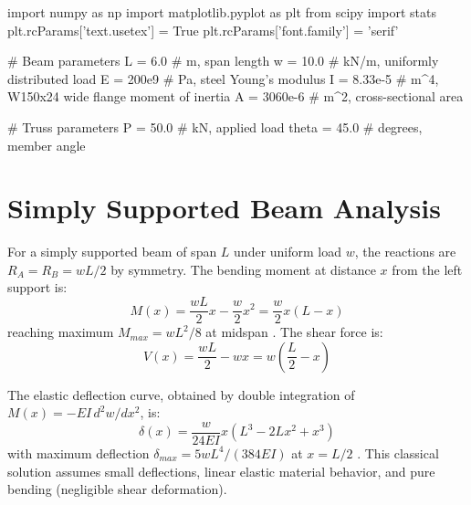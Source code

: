 \documentclass[11pt,a4paper]{article}
\begin{document}
\begin{pycode}

import numpy as np
import matplotlib.pyplot as plt
from scipy import stats
plt.rcParams['text.usetex'] = True
plt.rcParams['font.family'] = 'serif'

# Beam parameters
L = 6.0  # m, span length
w = 10.0  # kN/m, uniformly distributed load
E = 200e9  # Pa, steel Young's modulus
I = 8.33e-5  # m^4, W150x24 wide flange moment of inertia
A = 3060e-6  # m^2, cross-sectional area

# Truss parameters
P = 50.0  # kN, applied load
theta = 45.0  # degrees, member angle

\end{pycode}

\section{Simply Supported Beam Analysis}

For a simply supported beam of span $L$ under uniform load $w$, the reactions are $R_A = R_B = wL/2$ by symmetry. The bending moment at distance $x$ from the left support is:
\begin{equation}
M(x) = \frac{wL}{2}x - \frac{w}{2}x^2 = \frac{w}{2}x(L-x)
\end{equation}
reaching maximum $M_{max} = wL^2/8$ at midspan \cite{gere2009mechanics}. The shear force is:
\begin{equation}
V(x) = \frac{wL}{2} - wx = w\left(\frac{L}{2} - x\right)
\end{equation}

The elastic deflection curve, obtained by double integration of $M(x) = -EI \, d^2w/dx^2$, is:
\begin{equation}
\delta(x) = \frac{w}{24EI}x(L^3 - 2Lx^2 + x^3)
\end{equation}
with maximum deflection $\delta_{max} = 5wL^4/(384EI)$ at $x = L/2$ \cite{timoshenko1970theory}. This classical solution assumes small deflections, linear elastic material behavior, and pure bending (negligible shear deformation).
\end{document}
